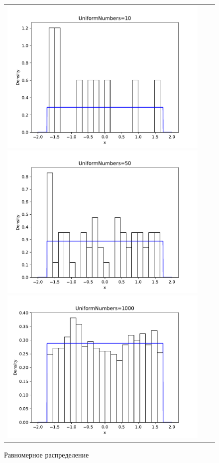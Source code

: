 \begin{figure}[H]
	\begin{tabular}{ccc}
		\includegraphics[scale=0.33]{uniform_hist_10.pdf}
		\includegraphics[scale=0.33]{uniform_hist_50.pdf}
		\includegraphics[scale=0.33]{uniform_hist_1000.pdf}
	\end{tabular}
	\caption{Равномерное распределение}
\end{figure}


